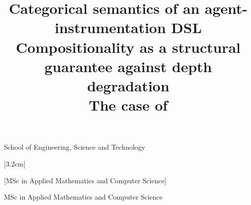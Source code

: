 
\SuppressMonthError

\title{Categorical semantics of an agent-instrumentation DSL\\%
      \large Compositionality as a structural guarantee against depth degradation\\\normalsize
      The case of \OASys}


%
       {School of Engineering, Science and Technology}


[3.2cm]

%
            [MSc in Applied Mathematics and Computer Science]

%
         {MSc in Applied Mathematics and Computer Science}



\newcommand{\tesispalabras}{Agent orchestration; category theory; monoidal categories; denotational semantics; static verification; \OASys}
\newcommand{\tesisresumen}{%
  \textit{[Translation pending --- see Spanish version.]}%
}

\newcommand{\tesislabelkeyw}{Keywords}
\newcommand{\tesislabeldecl}{Statement of intellectual autonomy.}
\newcommand{\tesisdeclcorta}{Short version --- the full signed text is in Appendix \ref{app:declaraciones}.}

